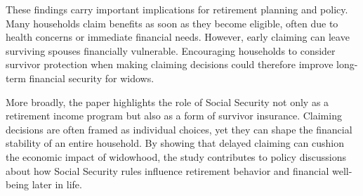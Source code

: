 \documentclass[11pt]{article}
\begin{document}
These findings carry important implications for retirement planning and policy. Many households claim benefits as soon as they become eligible, often due to health concerns or immediate financial needs. However, early claiming can leave surviving spouses financially vulnerable. Encouraging households to consider survivor protection when making claiming decisions could therefore improve long-term financial security for widows.

More broadly, the paper highlights the role of Social Security not only as a retirement income program but also as a form of survivor insurance. Claiming decisions are often framed as individual choices, yet they can shape the financial stability of an entire household. By showing that delayed claiming can cushion the economic impact of widowhood, the study contributes to policy discussions about how Social Security rules influence retirement behavior and financial well-being later in life.


\end{document}
